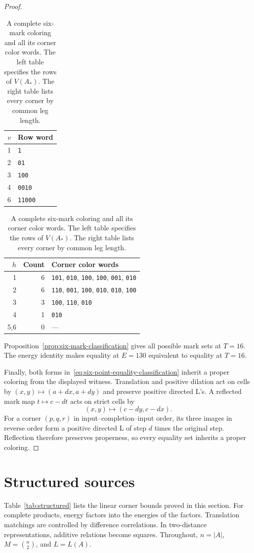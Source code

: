 \documentclass[11pt,a4paper]{article}
\newif\ifshowrevisions
\newcommand{\rev}[1]{{\ifshowrevisions\color{red}\fi #1}}
\theoremstyle{definition}
\numberwithin{equation}{section}
\begin{document}
\begin{proof}
\begin{table}[H]
\centering
\ifshowrevisions\color{red}\fi
\caption{\rev{A complete six-mark coloring and all its corner color words. The left table specifies the rows of $V(A_*)$. The right table lists every corner by common leg length.}}
\label{tab:six-point-witness}
\begin{tabular}{@{}rl@{}}
\toprule
$v$ & Row word\\\midrule
1 & \texttt{1}\\
2 & \texttt{01}\\
3 & \texttt{100}\\
4 & \texttt{0010}\\
6 & \texttt{11000}\\
\bottomrule
\end{tabular}
\qquad
\begin{tabular}{@{}rrl@{}}
\toprule
$h$ & Count & Corner color words\\\midrule
1 & 6 & \texttt{101}, \texttt{010}, \texttt{100}, \texttt{100}, \texttt{001}, \texttt{010}\\
2 & 6 & \texttt{110}, \texttt{001}, \texttt{100}, \texttt{010}, \texttt{010}, \texttt{100}\\
3 & 3 & \texttt{100}, \texttt{110}, \texttt{010}\\
4 & 1 & \texttt{010}\\
5,6 & 0 & ---\\
\bottomrule
\end{tabular}
\end{table}

Proposition~\ref{prop:six-mark-classification} gives all possible mark sets
at $T=16$. The energy identity makes equality at $E=130$ equivalent to
equality at $T=16$.

Finally, both forms in~\eqref{eq:six-point-equality-classification} inherit a proper coloring from the displayed witness. Translation and positive dilation act on cells by $(x,y)\mapsto(a+dx,a+dy)$ and preserve positive directed L's. A reflected mark map $t\mapsto c-dt$ acts on strict cells by
\[
(x,y)\longmapsto(c-dy,c-dx).
\]
For a corner $(p,q,r)$ in input--completion--input order, its three images in reverse order form a positive directed L of step $d$ times the original step. Reflection therefore preserves properness, so every equality set inherits a proper coloring.

\end{proof}

\section{Structured sources}\label{sec:structured}
Table~\ref{tab:structured} lists the linear corner bounds proved in this
section. For complete products, energy factors into the energies of the
factors. Translation matchings are controlled by difference correlations.
In two-distance representations, additive relations become squares. Throughout, $n=|A|$, $M=\binom n2$, and $L=L(A)$.
\end{document}

